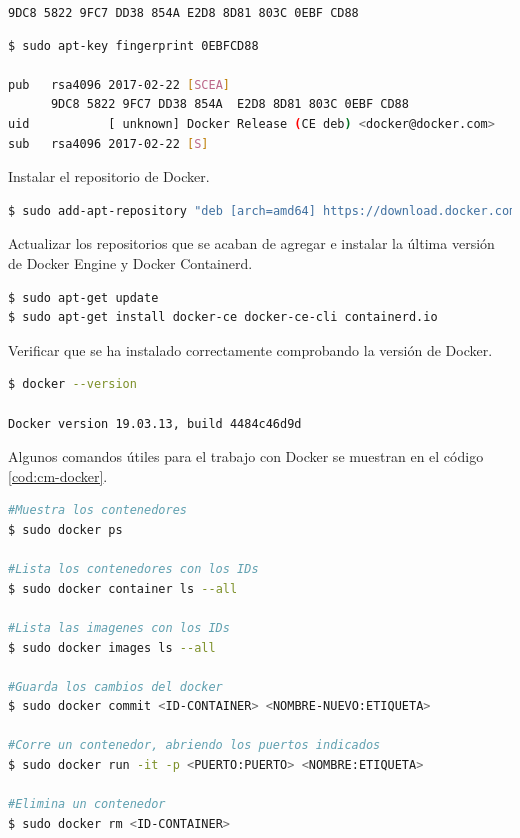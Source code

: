 \texttt{9DC8 5822 9FC7 DD38 854A  E2D8 8D81 803C 0EBF CD88}\\

\begin{lstlisting}[language=Bash,caption=Instalación Docker. Parte IV, label=cod:huella, style=Consola]
$ sudo apt-key fingerprint 0EBFCD88

pub   rsa4096 2017-02-22 [SCEA]
      9DC8 5822 9FC7 DD38 854A  E2D8 8D81 803C 0EBF CD88
uid           [ unknown] Docker Release (CE deb) <docker@docker.com>
sub   rsa4096 2017-02-22 [S]
\end{lstlisting}

Instalar el repositorio de Docker.\\ 

\begin{lstlisting}[language=Bash,caption=Instalación Docker. Parte V, label=cod:install-docker, style=Consola]
$ sudo add-apt-repository "deb [arch=amd64] https://download.docker.com/linux/ubuntu $(lsb_release -cs) stable"
\end{lstlisting}

Actualizar los repositorios que se acaban de agregar e instalar la última versión de Docker Engine y Docker Containerd.\\


\begin{lstlisting}[language=Bash,caption=Instalación Docker. Parte VI, label=cod:docker-update, style=Consola]
$ sudo apt-get update
$ sudo apt-get install docker-ce docker-ce-cli containerd.io
\end{lstlisting}

Verificar que se ha instalado correctamente comprobando la versión de Docker.\\

\begin{lstlisting}[language=Bash,caption=Instalación Docker. Parte VII, label=cod:docker-version, style=Consola]
$ docker --version

Docker version 19.03.13, build 4484c46d9d
\end{lstlisting}

Algunos comandos útiles para el trabajo con Docker se muestran en el código \ref{cod:cm-docker}.

\begin{lstlisting}[language=Bash,caption=Comandos útiles de Docker, label=cod:cm-docker]
#Muestra los contenedores
$ sudo docker ps

#Lista los contenedores con los IDs
$ sudo docker container ls --all

#Lista las imagenes con los IDs
$ sudo docker images ls --all 

#Guarda los cambios del docker
$ sudo docker commit <ID-CONTAINER> <NOMBRE-NUEVO:ETIQUETA>

#Corre un contenedor, abriendo los puertos indicados
$ sudo docker run -it -p <PUERTO:PUERTO> <NOMBRE:ETIQUETA>

#Elimina un contenedor
$ sudo docker rm <ID-CONTAINER>
\end{lstlisting}

